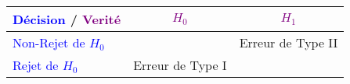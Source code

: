 \documentclass{standalone}
\begin{document}
 \begin{tabular}{| l || c | c | }
	\hline
	\textcolor{blue}{Décision} / \textcolor{purple}{Verité} & \textcolor{purple}{$H_0$} & \textcolor{purple}{$H_1$} \\ \hline\hline
	\textcolor{blue}{Non-Rejet de $H_0$} & \dSmiley[1.5] & Erreur de Type II \\ \hline
	\textcolor{blue}{Rejet de $H_0$} & Erreur de Type I & \dSmiley[1.5]  \\
	\hline
\end{tabular}
\end{document}
